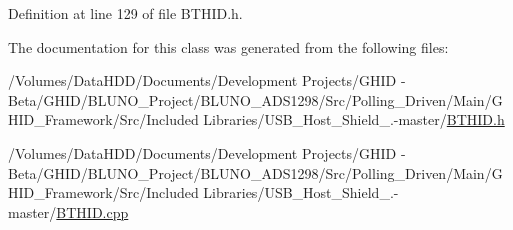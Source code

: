 \-Definition at line 129 of file \-B\-T\-H\-I\-D.\-h.



\-The documentation for this class was generated from the following files\-:\begin{DoxyCompactItemize}
\item 
/\-Volumes/\-Data\-H\-D\-D/\-Documents/\-Development Projects/\-G\-H\-I\-D -\/ Beta/\-G\-H\-I\-D/\-B\-L\-U\-N\-O\-\_\-\-Project/\-B\-L\-U\-N\-O\-\_\-\-A\-D\-S1298/\-Src/\-Polling\-\_\-\-Driven/\-Main/\-G\-H\-I\-D\-\_\-\-Framework/\-Src/\-Included Libraries/\-U\-S\-B\-\_\-\-Host\-\_\-\-Shield\-\_.-\/master/\hyperlink{_b_t_h_i_d_8h}{\-B\-T\-H\-I\-D.\-h}\item 
/\-Volumes/\-Data\-H\-D\-D/\-Documents/\-Development Projects/\-G\-H\-I\-D -\/ Beta/\-G\-H\-I\-D/\-B\-L\-U\-N\-O\-\_\-\-Project/\-B\-L\-U\-N\-O\-\_\-\-A\-D\-S1298/\-Src/\-Polling\-\_\-\-Driven/\-Main/\-G\-H\-I\-D\-\_\-\-Framework/\-Src/\-Included Libraries/\-U\-S\-B\-\_\-\-Host\-\_\-\-Shield\-\_.-\/master/\hyperlink{_b_t_h_i_d_8cpp}{\-B\-T\-H\-I\-D.\-cpp}\end{DoxyCompactItemize}
